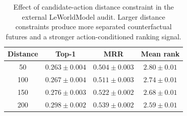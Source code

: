 \begin{table}[t]
\centering
\caption{Effect of candidate-action distance constraint in the external LeWorldModel audit. Larger distance constraints produce more separated counterfactual futures and a stronger action-conditioned ranking signal.}
\label{tab:official-lewm-dist-sweep}
\begin{tabular}{cccc}
\toprule
Distance & Top-1 & MRR & Mean rank \\
\midrule
50 & $0.263 \pm 0.004$ & $0.504 \pm 0.003$ & $2.80 \pm 0.01$ \\
100 & $0.267 \pm 0.004$ & $0.511 \pm 0.003$ & $2.74 \pm 0.01$ \\
150 & $0.276 \pm 0.003$ & $0.522 \pm 0.002$ & $2.68 \pm 0.01$ \\
200 & $0.298 \pm 0.002$ & $0.539 \pm 0.002$ & $2.59 \pm 0.01$ \\
\bottomrule
\end{tabular}
\end{table}